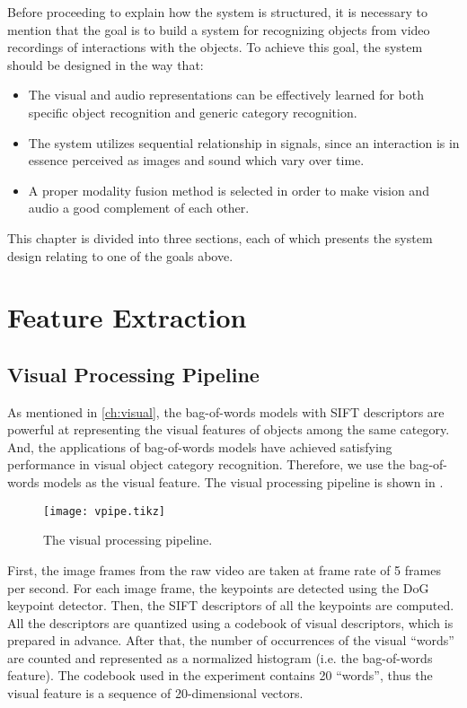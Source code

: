 \documentclass[12pt,final,twoside]{report}
\begin{document}
Before proceeding to explain how the system is structured, it is necessary to mention that the goal is to build a system for recognizing objects from video recordings of interactions with the objects. To achieve this goal, the system should be designed in the way that:
\begin{itemize}
  \item The visual and audio representations can be effectively learned for both specific object recognition and generic category recognition.
  \item The system utilizes sequential relationship in signals, since an interaction is in essence perceived as images and sound which vary over time.
  \item A proper modality fusion method is selected in order to make vision and audio a good complement of each other.
\end{itemize}

This chapter is divided into three sections, each of which presents the system design relating to one of the goals above.

\section{Feature Extraction}
\subsection{Visual Processing Pipeline}
As mentioned in \cref{ch:visual}, the bag-of-words models with SIFT descriptors are powerful at representing the visual features of objects among the same category. And, the applications of bag-of-words models have achieved satisfying performance in visual object category recognition. Therefore, we use the bag-of-words models as the visual feature. The visual processing pipeline is shown in . 

\begin{figure}[t]
  \centering
  \texttt{[image: vpipe.tikz]}
  \caption{The visual processing pipeline.}
  \label{fig:vpipe}
\end{figure}

First, the image frames from the raw video are taken at frame rate of 5 frames per second. For each image frame, the keypoints are detected using the DoG keypoint detector. Then, the SIFT descriptors of all the keypoints are computed. All the descriptors are quantized using a codebook of visual descriptors, which is prepared in advance. After that, the number of occurrences of the visual ``words'' are counted and represented as a normalized histogram (i.e. the bag-of-words feature). The codebook used in the experiment contains 20 ``words'', thus the visual feature is a sequence of 20-dimensional vectors.
\end{document}
